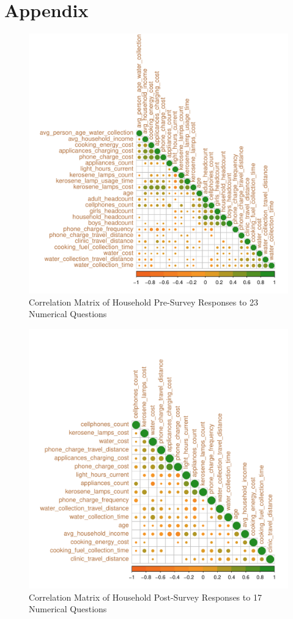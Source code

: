 \section{Appendix}
\label{sec:appendix}

\begin{figure}[ht]
	\centering
	\includegraphics[width=\textwidth]{images/hs_pre_corr_plot.pdf}
	\caption{Correlation Matrix of Household Pre-Survey Responses to 23 Numerical Questions}
	\label{fig:corr-pre}
\end{figure}

\begin{figure}
	\centering
	\includegraphics[width=\textwidth]{images/hs_post_corr_plot.pdf}
	\caption{Correlation Matrix of Household Post-Survey Responses to 17 Numerical Questions}
	\label{fig:corr-post-hh}
\end{figure}

